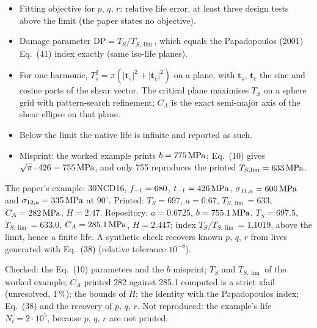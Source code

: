 \begin{itemize}
\item Fitting objective for $p$, $q$, $r$: relative life error, at least three design tests above the
  limit (the paper states no objective).
\item Damage parameter $\mathrm{DP}=T_S/T_{S,\lim}$, which equals the Papadopoulos (2001) Eq.~(41) index
  exactly (same iso-life planes).
\item For one harmonic, $T_s^2=\pi(|\mathbf t_s|^2+|\mathbf t_c|^2)$ on a plane, with $\mathbf t_s$,
  $\mathbf t_c$ the sine and cosine parts of the shear vector. The critical plane maximises $T_S$ on a
  sphere grid with pattern-search refinement; $C_A$ is the exact semi-major axis of the shear ellipse
  on that plane.
\item Below the limit the native life is infinite and reported as such.
\item Misprint: the worked example prints $b=775\,\mathrm{MPa}$; Eq.~(10) gives $\sqrt\pi\cdot426=755\,\mathrm{MPa}$, and only
  755 reproduces the printed $T_{S,\lim}=633\,\mathrm{MPa}$.
\end{itemize}

 The paper's example: 30NCD16, $f_{-1}=680$, $t_{-1}=426\,\mathrm{MPa}$, $\sigma_{11,a}=600\,\mathrm{MPa}$ and
$\sigma_{12,a}=335\,\mathrm{MPa}$ at $90^\circ$. Printed: $T_S=697$, $a=0.67$, $T_{S,\lim}=633$, $C_A=282\,\mathrm{MPa}$,
$H=2.47$. Repository: $a=0.6725$, $b=755.1\,\mathrm{MPa}$, $T_S=697.5$, $T_{S,\lim}=633.0$, $C_A=285.1\,\mathrm{MPa}$,
$H=2.447$; index $T_S/T_{S,\lim}=1.1019$, above the limit, hence a finite life. A synthetic check recovers
known $p$, $q$, $r$ from lives generated with Eq.~(38) (relative tolerance $10^{-8}$).

 Checked: the Eq.~(10) parameters and the $b$ misprint; $T_S$ and $T_{S,\lim}$ of the
worked example; $C_A$ printed 282 against 285.1 computed is a strict xfail (unresolved, 1\,\%); the
bounds of $H$; the identity with the Papadopoulos index; Eq.~(38) and the recovery of $p$, $q$, $r$. Not
reproduced: the example's life $N_i=2\cdot10^5$, because $p$, $q$, $r$ are not printed.
